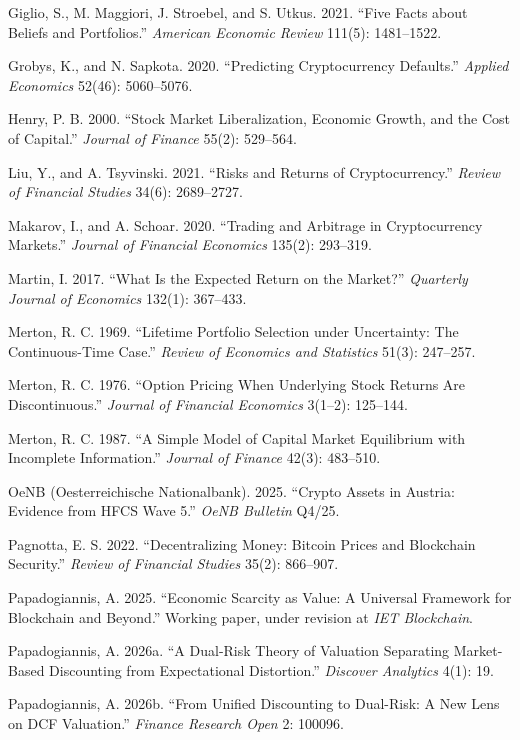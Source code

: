 \documentclass[11pt]{article}
\begin{document}
\begin{list}{}{\setlength{\itemindent}{-1.5em}\setlength{\leftmargin}{1.5em}\setlength{\itemsep}{2pt}\setlength{\parsep}{0pt}}
\item Giglio, S., M. Maggiori, J. Stroebel, and S. Utkus. 2021. ``Five Facts about Beliefs and Portfolios.'' \emph{American Economic Review} 111(5): 1481--1522.
\item Grobys, K., and N. Sapkota. 2020. ``Predicting Cryptocurrency Defaults.'' \emph{Applied Economics} 52(46): 5060--5076.
\item Henry, P. B. 2000. ``Stock Market Liberalization, Economic Growth, and the Cost of Capital.'' \emph{Journal of Finance} 55(2): 529--564.
\item Liu, Y., and A. Tsyvinski. 2021. ``Risks and Returns of Cryptocurrency.'' \emph{Review of Financial Studies} 34(6): 2689--2727.
\item Makarov, I., and A. Schoar. 2020. ``Trading and Arbitrage in Cryptocurrency Markets.'' \emph{Journal of Financial Economics} 135(2): 293--319.
\item Martin, I. 2017. ``What Is the Expected Return on the Market?'' \emph{Quarterly Journal of Economics} 132(1): 367--433.
\item Merton, R. C. 1969. ``Lifetime Portfolio Selection under Uncertainty: The Continuous-Time Case.'' \emph{Review of Economics and Statistics} 51(3): 247--257.
\item Merton, R. C. 1976. ``Option Pricing When Underlying Stock Returns Are Discontinuous.'' \emph{Journal of Financial Economics} 3(1--2): 125--144.
\item Merton, R. C. 1987. ``A Simple Model of Capital Market Equilibrium with Incomplete Information.'' \emph{Journal of Finance} 42(3): 483--510.
\item OeNB (Oesterreichische Nationalbank). 2025. ``Crypto Assets in Austria: Evidence from HFCS Wave 5.'' \emph{OeNB Bulletin} Q4/25.
\item Pagnotta, E. S. 2022. ``Decentralizing Money: Bitcoin Prices and Blockchain Security.'' \emph{Review of Financial Studies} 35(2): 866--907.
\item Papadogiannis, A. 2025. ``Economic Scarcity as Value: A Universal Framework for Blockchain and Beyond.'' Working paper, under revision at \emph{IET Blockchain}.
\item Papadogiannis, A. 2026a. ``A Dual-Risk Theory of Valuation Separating Market-Based Discounting from Expectational Distortion.'' \emph{Discover Analytics} 4(1): 19.
\item Papadogiannis, A. 2026b. ``From Unified Discounting to Dual-Risk: A New Lens on DCF Valuation.'' \emph{Finance Research Open} 2: 100096.

\end{list}
\end{document}
